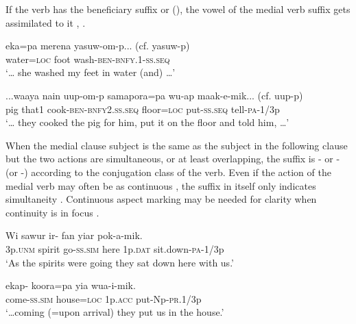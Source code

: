 If the verb has the beneficiary suffix  or  (), the vowel of the medial verb suffix gets assimilated to it , .

\ea%
\label{ex:3:x1930}
\gll {\dots}eka=pa merena yasuw-om-p... (cf. yasuw-p) \\
water=\textsc{loc} foot wash-\textsc{ben}-\textsc{bnfy}.1-\textsc{ss}.\textsc{seq}\\
\glt`{\dots} she washed my feet in water (and) {\dots}'
\z

\ea%
\label{ex:3:x1929}
\gll ...waaya nain uup-om-p samapora=pa wu-ap maak-e-mik... (cf. uup-p)\\
pig that1 cook-\textsc{ben}-\textsc{bnfy}2.\textsc{ss}.\textsc{seq} floor=\textsc{loc} put-\textsc{ss}.\textsc{seq} tell-\textsc{pa}-1/3p\\
\glt`{\dots} they cooked the pig for him, put it on the floor and told him, {\dots}'
\z

When the medial clause subject is the same as the subject in the following clause but the two actions are simultaneous, or at least overlapping, the suffix is \nobreakdash- or \nobreakdash- (or \nobreakdash-) according to the conjugation class of the verb. Even if the action of the medial verb may often be  as continuous , the suffix in itself only indicates simultaneity . Continuous aspect marking may be needed for clarity when continuity is in focus .

\ea%
\label{ex:3:x239}
\gll Wi sawur ir- fan yiar pok-a-mik. \\
3p.\textsc{unm} spirit go-\textsc{ss}.\textsc{sim} here 1p.\textsc{dat} sit.down-\textsc{pa}-1/3p \\
\glt`As the spirits were going they sat down here with us.' 
\z

\ea%
\label{ex:3:x240}
\gll {\dots}ekap- koora=pa yia wua-i-mik. \\
come-\textsc{ss}.\textsc{sim} house=\textsc{loc} 1p.\textsc{acc} put-Np-\textsc{pr}.1/3p \\
\glt`{\dots}coming (=upon arrival) they put us in the house.' 
\z

